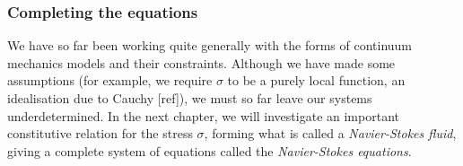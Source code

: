 
\subsubsection{Completing the equations}
We have so far been working quite generally with the forms of continuum mechanics models and their constraints. Although we have made some assumptions
(for example, we require $\sigma$ to be a purely local function, an idealisation due to Cauchy [ref]), we must so far leave
our systems underdetermined.
In the next chapter, we will
investigate an important constitutive relation for the stress $\sigma$, forming what is called a \textit{Navier-Stokes fluid},
giving a complete system of equations called the \textit{Navier-Stokes equations}.
